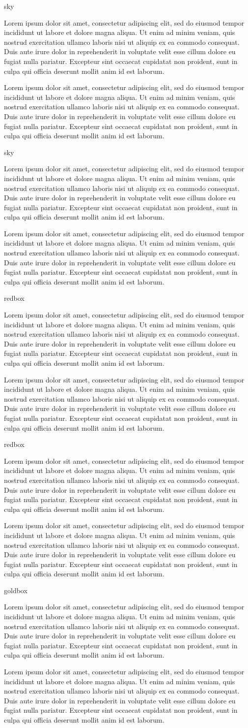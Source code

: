 \documentclass[10pt]{article}
\newcommand{\LoremIpsum}{
    Lorem ipsum dolor sit amet, consectetur adipiscing elit, sed do eiusmod
    tempor incididunt ut labore et dolore magna aliqua. Ut enim ad minim
    veniam, quis nostrud exercitation ullamco laboris nisi ut aliquip ex ea
    commodo consequat. Duis aute irure dolor in reprehenderit in voluptate
    velit esse cillum dolore eu fugiat nulla pariatur. Excepteur sint
    occaecat cupidatat non proident, sunt in culpa qui officia deserunt
    mollit anim id est laborum.
}
\begin{document}
    \renewcommand{\arraystretch}{1.6}
    \begin{skillbox}{sky}
        \begin{minipage}[t]{0.48\linewidth}
            \LoremIpsum
        \end{minipage}
        \hfill
        \begin{minipage}[t]{0.48\linewidth}
            \LoremIpsum
        \end{minipage}
    \end{skillbox}

    \renewcommand{\arraystretch}{1.6}
    \begin{skillbox}{sky}
        \begin{minipage}[t]{0.48\linewidth}
            \LoremIpsum
        \end{minipage}
        \hfill
        \begin{minipage}[t]{0.48\linewidth}
            \LoremIpsum
        \end{minipage}
    \end{skillbox}

    \renewcommand{\arraystretch}{1.6}
    \begin{skillbox}{redbox}
        \begin{minipage}[t]{0.48\linewidth}
            \LoremIpsum
        \end{minipage}
        \hfill
        \begin{minipage}[t]{0.48\linewidth}
            \LoremIpsum
        \end{minipage}
    \end{skillbox}

    \renewcommand{\arraystretch}{1.6}
    \begin{skillbox}{redbox}
        \begin{minipage}[t]{0.48\linewidth}
            \LoremIpsum
        \end{minipage}
        \hfill
        \begin{minipage}[t]{0.48\linewidth}
            \LoremIpsum
        \end{minipage}
    \end{skillbox}

    \renewcommand{\arraystretch}{1.6}
    \begin{skillbox}{goldbox}
        \begin{minipage}[t]{0.48\linewidth}
            \LoremIpsum
        \end{minipage}
        \hfill
        \begin{minipage}[t]{0.48\linewidth}
            \LoremIpsum
        \end{minipage}
    \end{skillbox}
\end{document}
